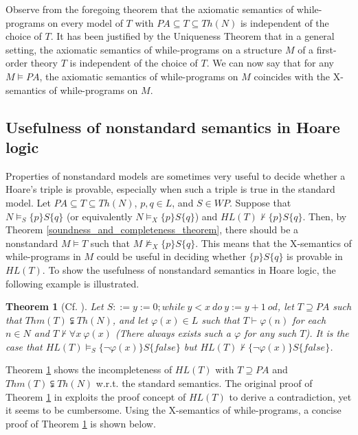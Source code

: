 \documentclass[a4paper,11pt]{article}
\begin{document}
Observe from the foregoing theorem that the axiomatic semantics of while-programs on every model of $T$ with $PA\subseteq T \subseteq Th(N)$ is independent of the choice of $T$. It has been justified by the Uniqueness Theorem \cite[p304]{bergstra_2} that in a general setting, the axiomatic semantics of while-programs on a structure $M$ of a first-order theory $T$ is independent of the choice of $T$. We can now say that for any $M\models PA$, the axiomatic semantics of while-programs on $M$ coincides with the X-semantics of while-programs on $M$.

\subsection{Usefulness of nonstandard semantics in Hoare logic}

Properties of nonstandard models are sometimes very useful to decide whether a Hoare's triple is provable, especially when such a triple is true in the standard model. Let $PA \subseteq T \subseteq Th(N)$, $p,q \in L$, and $S\in WP$. Suppose that $N \models_S \{p\}S\{q\}$ (or equivalently $N \models_X \{p\}S\{q\}$) and $HL(T)\not\vdash \{p\}S\{q\}$. Then, by Theorem \ref{soundness_and_completeness_theorem}, there should be a nonstandard $M\models T$ such that $M \not\models_X \{p\}S\{q\}$. This means that the X-semantics of while-programs in $M$ could be useful in deciding whether $\{p\}S\{q\}$ is provable in $HL(T)$. To show the usefulness of nonstandard semantics in Hoare logic, the following example is illustrated.

\theoremstyle{plain}
\newtheorem{incompleteness_of_hl}{Theorem}[subsection]
\begin{incompleteness_of_hl}[Cf. {\cite[Theorem 4.3]{bergstra_1}}]\label{incompleteness_of_hl}
Let $S ::= y:=0; while\ y<x\ do\ y:=y+1\ od$, let $T \supseteq PA$ such that $Thm(T)\subsetneqq Th(N)$, and let $\varphi(x)\in L$ such that $T\vdash \varphi(n)$ for each $n\in N$ and $T\nvdash \forall x\ \varphi(x)$ (There always exists such a $\varphi$ for any such $T$). It is the case that $HL(T)\models_S \{\neg\varphi(x)\} S \{false\}$ but $HL(T)\nvdash \{\neg\varphi(x)\} S \{false\}$.
\end{incompleteness_of_hl}

Theorem \ref{incompleteness_of_hl} shows the incompleteness of $HL(T)$ with $T \supseteq PA$ and $Thm(T)\subsetneqq Th(N)$ w.r.t. the standard semantics. The original proof of Theorem \ref{incompleteness_of_hl} in \cite[the proof of Theorem 4.3]{bergstra_1} exploits the proof concept of $HL(T)$ to derive a contradiction, yet it seems to be cumbersome. Using the X-semantics of while-programs, a concise proof of Theorem \ref{incompleteness_of_hl} is shown below.
\end{document}
